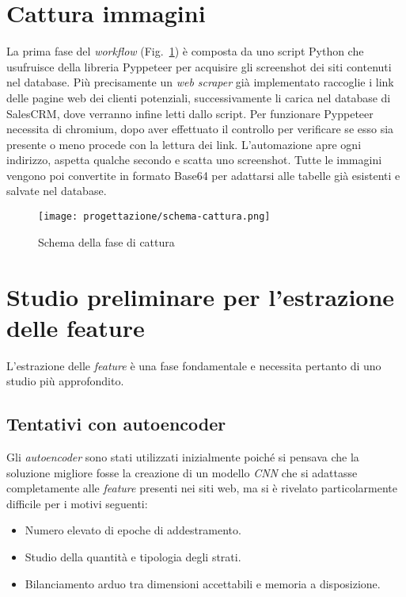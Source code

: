 \section{Cattura immagini}
La prima fase del \emph{workflow} (Fig.~\ref{fig:schema-cattura}) è composta da uno script Python che usufruisce della libreria Pyppeteer per acquisire gli screenshot dei siti contenuti nel database.
Più precisamente un \emph{web scraper} già implementato raccoglie i link delle pagine web dei clienti potenziali, successivamente li carica nel database di SalesCRM, dove verranno infine letti dallo script.
Per funzionare Pyppeteer necessita di chromium, dopo aver effettuato il controllo per verificare se esso sia presente o meno procede con la lettura dei link. 
L'automazione apre ogni indirizzo, aspetta qualche secondo e scatta uno screenshot. 
Tutte le immagini vengono poi convertite in formato Base64 per adattarsi alle tabelle già esistenti e salvate nel database.

\begin{figure}[!h] 
  \centering 
  \texttt{[image: progettazione/schema-cattura.png]} 
  \caption{Schema della fase di cattura}
  \label{fig:schema-cattura}
\end{figure}

\newpage

\section{Studio preliminare per l'estrazione delle feature}
L'estrazione delle \emph{feature} è una fase fondamentale e necessita pertanto di uno studio più approfondito.

\subsection{Tentativi con autoencoder}
Gli \emph{autoencoder} sono stati utilizzati inizialmente poiché si pensava che la soluzione migliore fosse la creazione di un modello \emph{CNN} che si adattasse completamente alle \emph{feature} presenti nei siti web, ma si è rivelato particolarmente difficile per i motivi seguenti:
\begin{itemize}
  \item Numero elevato di epoche di addestramento.
  \item Studio della quantità e tipologia degli strati.
  \item Bilanciamento arduo tra dimensioni accettabili e memoria a disposizione.
\end{itemize}

